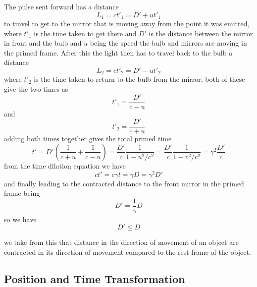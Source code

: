 The pulse sent forward has a distance
\begin{equation}
	L_1= ct'_1= D' + ut'_1
\end{equation}
to travel to get to the mirror that is moving away from the point it was emitted, where $t'_1$ is the time taken to get there and $D'$ is the distance between the mirror in front and the bulb and $u$ being the speed the bulb and mirrors are moving in the primed frame. After this the light then has to travel back to the bulb a distance
\begin{equation}
	L_2 = ct'_2= D' - ut'_2
\end{equation}
where $t'_2$ is the time taken to return to the bulb from the mirror, both of these give the two times as
\begin{equation}
	t'_1=\frac{D'}{c-u}
\end{equation}
and
\begin{equation}
	t'_2=\frac{D'}{c+u}
\end{equation}
adding both times together gives the total primed time
\begin{equation}
	t' = D'(\frac{1}{c+u} + \frac{1}{c-u})=\frac{D'}{c}\frac{1}{1-u^2/c^2} =\frac{D'}{c}\frac{1}{1-v^2/c^2}=\gamma^2 \frac{D'}{c}
\end{equation}
from the time dilation equation we have
\begin{equation}
	ct'=c\gamma t = \gamma D = \gamma^2 D'
\end{equation}
and finally leading to the contracted distance to the front mirror in the primed frame being
\begin{equation}
	D' = \frac{1}{\gamma}D
\end{equation}
so we have
\begin{equation}
	D' \leq D
\end{equation}

we take from this that distance in the direction of movement of an object are contracted in its direction of movement compared to the rest frame of the object.


\subsection{Position and Time Transformation}

